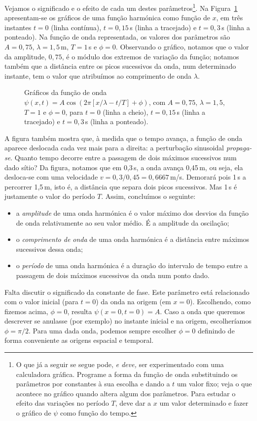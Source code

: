 Vejamos o significado e o efeito de cada um destes parâmetros\footnote{O que já
a seguir se segue pode, \emph{e deve,} ser experimentado com uma calculadora
gráfica. Programe a forma da função de onda substituindo os parâmetros por
constantes à sua escolha e dando a $t$ um valor fixo; veja o que acontece no
gráfico quando altera algum dos parâmetros. Para estudar o efeito das variações
no período $T$, deve dar a $x$ um valor determinado e fazer o gráfico de $\psi$
como função do tempo.}.
Na Figura~\ref{fig:20-050} apresentam-se os gráficos de uma função harmónica
como função de $x$, em três instantes $t=0$ (linha contínua), $t=0,15$\,s (linha
a tracejado) e $t=0,3$\,s (linha a ponteado). Na função de onda representada, os
valores dos parâmetros são $A=0,75$, $\lambda=1,5$\,m, $T=1$\,s e $\phi=0$.
Observando o gráfico, notamos que o valor da amplitude, $0,75$, é o módulo dos
extremos de variação da função; notamos também que a distância entre os picos
sucessivos da onda, num determinado instante, tem o valor que atribuímos ao
comprimento de onda $\lambda$.
\begin{figure}[htb]
{\centering
    \par
}
\caption{Gráficos da função de onda
$\psi(x,t)=A\cos(2\pi[x/\lambda-t/T]+\phi)$, com $A=0,75$, $\lambda=1,5$, $T=1$
e $\phi=0$, para $t=0$ (linha a cheio), $t=0,15$\,s (linha a tracejado) e
$t=0,3$\,s (linha a ponteado).\label{fig:20-050}}
\end{figure}
A figura também mostra que, à medida que o tempo avança, a função de onda
aparece deslocada cada vez mais para a direita: a perturbação sinusoidal
\emph{propaga-se}. Quanto tempo decorre entre a passagem de dois máximos
sucessivos num dado sítio? Da figura, notamos que em 0,3\,s, a onda avança
0,45\,m, ou seja, ela desloca-se com uma velocidade $v = 0,3/0,45=0,6667$\,m/s.
Demorará pois 1\,s a percorrer 1,5\,m, isto é, a distância que separa dois picos
sucessivos. Mas 1\,s é justamente o valor do período $T$. Assim, concluímos o
seguinte:
\begin{itemize}
\item
    a \emph{amplitude} de uma onda harmónica é o valor máximo dos desvios da
    função de onda relativamente ao seu valor médio. É a amplitude da oscilação;
\item
    o \emph{comprimento de onda} de uma onda harmónica é a distância entre
    máximos sucessivos dessa onda;
\item
    o \emph{período} de uma onda harmónica é a duração do intervalo de tempo
    entre a passagem de dois máximos sucessivos da onda num ponto dado.
\end{itemize}
Falta discutir o significado da constante de fase. Este parâmetro está
relacionado com o valor inicial (para $t=0$) da onda na origem (em $x=0$).
Escolhendo, como fizemos acima, $\phi=0$, resulta $\psi(x=0,t=0)=A$. Caso a onda
que queremos descrever se anulasse (por exemplo) no instante inicial e na
origem, escolheríamos $\phi=\pi/2$. Para uma dada onda, podemos sempre escolher
$\phi=0$ definindo de forma conveniente as origens espacial e temporal.
 
